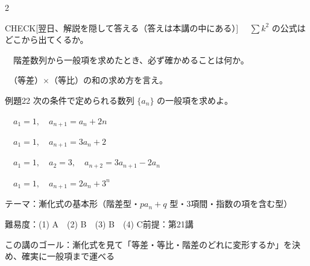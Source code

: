 \documentclass[paper=b5j, fontsize=8pt, fleqn, twoside]{jlreq}
\begin{document}
\begin{multicols*}{2}
  \begin{ptbs}{CHECK}[翌日、解説を隠して答える（答えは本講の中にある）]
    　$\sum k^2$ の公式はどこから出てくるか。\par
    　階差数列から一般項を求めたとき、必ず確かめることは何か。\par
    　（等差）$\times$（等比）の和の求め方を言え。
  \end{ptbs}

  \notefill
\end{multicols*}

\begin{ascolorbox4A}[出典：オリジナル]{例題22}
  次の条件で定められる数列 $\{a_n\}$ の一般項を求めよ。\par
  　$a_1=1,\quad a_{n+1}=a_n+2n$\par
  　$a_1=1,\quad a_{n+1}=3a_n+2$\par
  　$a_1=1,\quad a_2=3,\quad a_{n+2}=3a_{n+1}-2a_n$\par
  　$a_1=1,\quad a_{n+1}=2a_n+3^n$
\end{ascolorbox4A}

\begin{Data}
  テーマ：漸化式の基本形（階差型・$pa_n+q$ 型・3項間・指数の項を含む型）\par
  難易度：(1) A　(2) B　(3) B　(4) C\quad 前提：第21講\par
  この講のゴール：漸化式を見て「等差・等比・階差のどれに変形するか」を決め、確実に一般項まで運べる
\end{Data}
\end{document}
